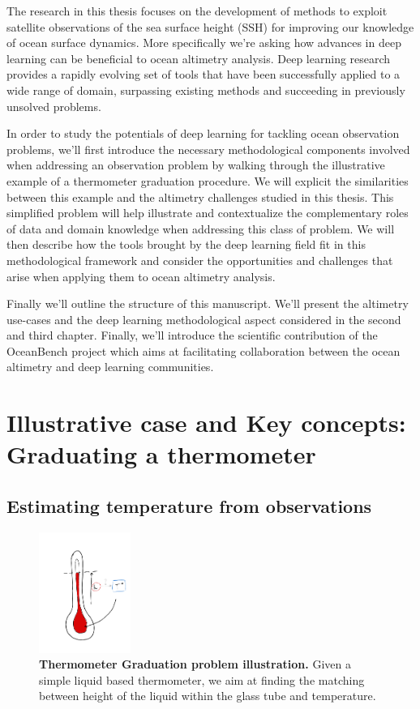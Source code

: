 \begin{bibunit}
  The research in this thesis focuses on the development of methods to exploit satellite observations of the sea surface height (SSH) for improving our knowledge of ocean surface dynamics. 
  More specifically we're asking how advances in deep learning can be beneficial to ocean altimetry analysis.
  Deep learning research provides a rapidly evolving set of tools that have been successfully applied to a wide range of domain, surpassing existing methods and succeeding in previously unsolved problems.
  
  In order to study the potentials of deep learning for tackling ocean observation problems, we'll first introduce the necessary methodological components involved when addressing an observation problem by walking through the illustrative example of a thermometer graduation procedure.
  We will explicit the similarities between this example and the altimetry challenges studied in this thesis.
 This simplified problem will help illustrate and contextualize the complementary roles of data and domain knowledge when addressing this class of problem. 
  We will then describe how the tools brought by the deep learning field fit in this methodological framework and consider the opportunities and challenges that arise when applying them to ocean altimetry analysis.

  Finally we'll outline the structure of this manuscript. We'll present the altimetry use-cases and the deep learning methodological aspect considered in the second and third chapter. Finally, we'll introduce the scientific contribution of the OceanBench project which aims at facilitating collaboration between the ocean altimetry and deep learning communities.
  


  \section{Illustrative case and Key concepts: Graduating a thermometer}


\subsection*{Estimating temperature from observations}
\begin{figure}[h]
    \centering
        \includegraphics[clip, width=3cm]{Introduction/pics/therm_pb.png}
    \caption{\textbf{Thermometer Graduation problem illustration.} Given a simple liquid based thermometer, we aim at finding the matching between height of the liquid within the glass tube and temperature.}
    \label{fig:therm_calib}
\end{figure}


\end{bibunit}
